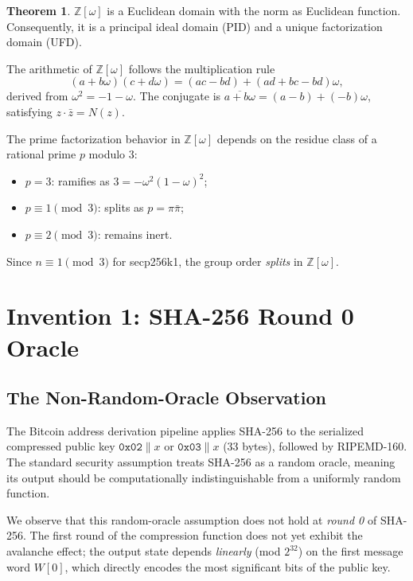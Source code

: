 \documentclass[11pt,a4paper]{article}
\theoremstyle{definition}
\newtheorem{theorem}{Theorem}[section]
\newcommand{\Zomega}{\mathbb{Z}[\omega]}
\begin{document}
\begin{theorem}
$\Zomega$ is a Euclidean domain with the norm as Euclidean function. Consequently, it is a principal ideal domain (PID) and a unique factorization domain (UFD).
\end{theorem}

The arithmetic of $\Zomega$ follows the multiplication rule
\begin{equation}
(a + b\omega)(c + d\omega) = (ac - bd) + (ad + bc - bd)\omega,
\end{equation}
derived from $\omega^2 = -1 - \omega$. The conjugate is $\overline{a + b\omega} = (a - b) + (-b)\omega$, satisfying $z \cdot \bar{z} = N(z)$.

The prime factorization behavior in $\Zomega$ depends on the residue class of a rational prime $p$ modulo 3:
\begin{itemize}
\item $p = 3$: ramifies as $3 = -\omega^2(1-\omega)^2$;
\item $p \equiv 1 \pmod{3}$: splits as $p = \pi \bar{\pi}$;
\item $p \equiv 2 \pmod{3}$: remains inert.
\end{itemize}

Since $n \equiv 1 \pmod{3}$ for secp256k1, the group order \textit{splits} in $\Zomega$.


\section{Invention 1: SHA-256 Round 0 Oracle}\label{sec:oracle}

\subsection{The Non-Random-Oracle Observation}

The Bitcoin address derivation pipeline applies SHA-256 to the serialized compressed public key $\texttt{0x02} \| x$ or $\texttt{0x03} \| x$ (33 bytes), followed by RIPEMD-160. The standard security assumption treats SHA-256 as a random oracle, meaning its output should be computationally indistinguishable from a uniformly random function.

We observe that this random-oracle assumption does not hold at \textit{round 0} of SHA-256. The first round of the compression function does not yet exhibit the avalanche effect; the output state depends \textit{linearly} (mod $2^{32}$) on the first message word $W[0]$, which directly encodes the most significant bits of the public key.
\end{document}
